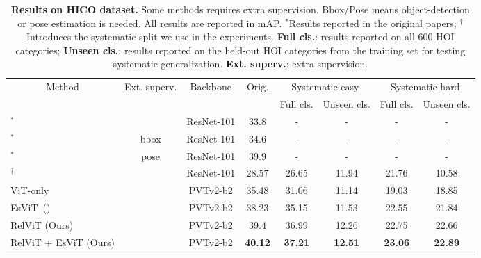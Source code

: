 \documentclass{article} \usepackage{iclr2022_conference,times}
\begin{document}
\begin{table}[t!]
    \centering
    \setlength\tabcolsep{1.5pt}
    \begin{tabular}{lccccccc}
    \toprule
         \multicolumn{1}{c}{\multirow{2}{*}{Method}} & \multicolumn{1}{c}{\multirow{2}{*}{Ext. superv.}}  & \multicolumn{1}{c}{\multirow{2}{*}{Backbone}} & \multicolumn{1}{c}{\multirow{2}{*}{Orig.}} & \multicolumn{2}{c}{Systematic-easy} & \multicolumn{2}{c}{Systematic-hard}  \\ \cline{5-8}
         &&&&\small{Full cls.}&\small{Unseen cls.}&\small{Full cls.}&\small{Unseen cls.} \\
    \midrule 
         \cite{mallya2016learning}$^*$& & ResNet-101 &33.8 & - & - &-&-\\  \cite{girdhar2017attentional}$^*$ &bbox &ResNet-101& 34.6 & - & -& -&-\\  \cite{fang2018pairwise}$^*$  &pose &ResNet-101& 39.9 & - &-& -&-\\  \cite{vcl}$^\dagger$ &&ResNet-101 &28.57 &26.65 &11.94&21.76 &10.58\\  \midrule
         ViT-only & &PVTv2-b2&35.48 &31.06 &11.14&19.03 &18.85\\  EsViT~(\citeyear{esvit})  &&PVTv2-b2 &38.23 &35.15 &11.53 &22.55&21.84 \\  \rowcolor[gray]{0.9}
         RelViT (Ours)  &&PVTv2-b2 & 39.4 & 36.99 & 12.26&22.75&22.66\\  \rowcolor[gray]{0.9}
         RelViT + EsViT (Ours) & &PVTv2-b2& \textbf{40.12} & \textbf{37.21} & \textbf{12.51} &\textbf{23.06}&\textbf{22.89} \\  \bottomrule
    \end{tabular}
    \vskip -0.1in
    \caption{\textbf{Results on HICO dataset.} Some methods requires extra supervision. Bbox/Pose means object-detection or pose estimation is needed. All results are reported in mAP. $^*$Results reported in the original papers; $^\dagger$Introduces the systematic split we use in the experiments. \textbf{Full cls.}: results reported on all 600 HOI categories; \textbf{Unseen cls.}: results reported on the held-out HOI categories from the training set for testing systematic generalization. \textbf{Ext. superv.}: extra supervision.}
    \label{tab:main_hico}
    \vskip -0.25in
\end{table}
\end{document}
